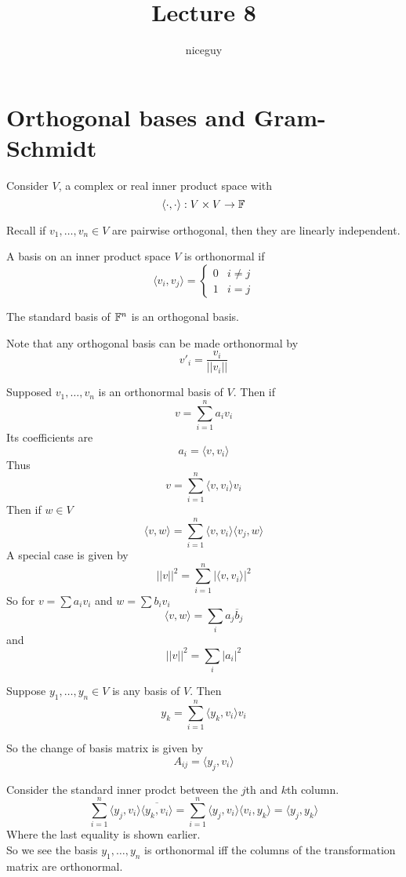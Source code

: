 \documentclass[12pt]{article}
\author{niceguy}
\title{Lecture 8}
\begin{document}
\maketitle

\section{Orthogonal bases and Gram-Schmidt}
Consider $V$, a complex or real inner product space with
$$\langle \cdot,\cdot \rangle: V \times V \rightarrow \mathbb{F}$$

Recall if $v_1,\dots,v_n\in V$ are pairwise orthogonal, then they are linearly independent.

\begin{defn}
	A basis on an inner product space $V$ is orthonormal if
	$$\langle v_i,v_j \rangle = \begin{cases} 0 & i\neq j \\ 1 & i=j \end{cases}$$
\end{defn}

\begin{ex}
	The standard basis of $\mathbb{F}^n$ is an orthogonal basis.
\end{ex}

Note that any orthogonal basis can be made orthonormal by
$$v'_i = \frac{v_i}{||v_i||}$$

Supposed $v_1,\dots,v_n$ is an orthonormal basis of $V$. Then if
$$v = \sum_{i=1}^n a_iv_i$$
Its coefficients are
$$a_i = \langle v,v_i \rangle$$
Thus
$$v = \sum_{i=1}^n \langle v,v_i \rangle v_i$$
Then if $w \in V$
$$\langle v,w \rangle = \sum_{i=1}^n \langle v,v_i\rangle \langle v_j,w \rangle$$
A special case is given by
$$||v||^2 = \sum_{i=1}^n |\langle v,v_i \rangle|^2$$
So for $v=\sum a_iv_i$ and $w = \sum b_iv_i$
$$\langle v,w \rangle = \sum_i a_j\overline{b}_j$$
and
$$||v||^2 = \sum_i |a_i|^2$$

Suppose $y_1,\dots,y_n \in V$ is any basis of $V$. Then
$$y_k = \sum_{i=1}^n \langle y_k,v_i \rangle v_i$$

So the change of basis matrix is given by
$$A_{ij} = \langle y_j,v_i \rangle$$

Consider the standard inner prodct between the $j$th and $k$th column.
$$\sum_{i=1}^n \langle y_j,v_i \rangle \overline{\langle y_k,v_i \rangle} = \sum_{i=1}^n \langle y_j,v_i \rangle \langle v_i, y_k \rangle = \langle y_j,y_k \rangle$$
Where the last equality is shown earlier. \\
So we see the basis $y_1,\dots,y_n$ is orthonormal iff the columns of the transformation matrix are orthonormal.
\end{document}
